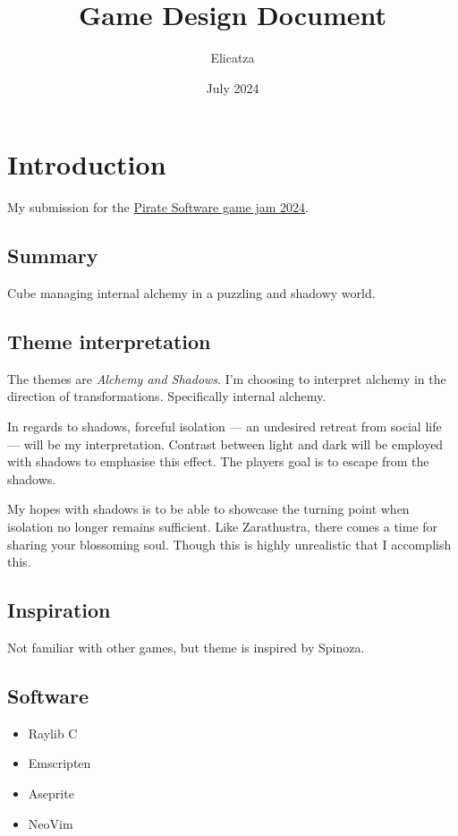 \documentclass[12pt, letterpaper]{article}
\title{\textbf{Game Design Document}}
\author{Elicatza}
\date{July 2024}
\begin{document}
\maketitle
\tableofcontents
\section{Introduction}

My submission for the 
\href{https://itch.io/jam/pirate}{Pirate Software game jam 2024}.

\subsection{Summary}
Cube managing internal alchemy in a puzzling and shadowy world.

\subsection{Theme interpretation}

The themes are \textit{Alchemy and Shadows}. I'm choosing to interpret alchemy
in the direction of transformations. Specifically internal alchemy.

In regards to shadows, forceful isolation --- an undesired retreat from social
life --- will be my interpretation. Contrast between light and dark will be
employed with shadows to emphasise this effect. The players goal is to escape
from the shadows.

My hopes with shadows is to be able to showcase the turning point when
isolation no longer remains sufficient. Like Zarathustra, there comes a time
for sharing your blossoming soul. Though this is highly unrealistic that I
accomplish this.

\subsection{Inspiration}

Not familiar with other games, but theme is inspired by Spinoza.

\subsection{Software}
\begin{itemize}[itemsep=1pt]
    \item Raylib C
    \item Emscripten
    \item Aseprite
    \item NeoVim
\end{itemize}
\end{document}
